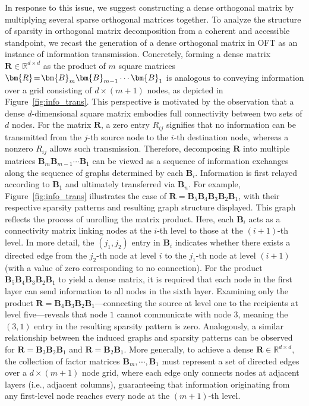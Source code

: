 In response to this issue, we suggest constructing a dense orthogonal matrix by multiplying several sparse orthogonal matrices together. To analyze the structure of sparsity in orthogonal matrix decomposition from a coherent and accessible standpoint, we recast the generation of a dense orthogonal matrix in OFT as an instance of information transmission. Concretely, forming a dense matrix $\bm{R}\in\mathbb{R}^{d\times d}$ as the product of $m$ square matrices $\thickmuskip=2mu \medmuskip=2mu \bm{R}=\bm{B}_m\bm{B}_{m-1}\cdots\bm{B}_1$ is analogous to conveying information over a grid consisting of $d\times (m+1)$ nodes, as depicted in Figure~\ref{fig:info_trans}. This perspective is motivated by the observation that a dense $d$-dimensional square matrix embodies full connectivity between two sets of $d$ nodes. For the matrix $\bm{R}$, a zero entry $R_{ij}$ signifies that no information can be transmitted from the $j$-th source node to the $i$-th destination node, whereas a nonzero $R_{ij}$ allows such transmission. Therefore, decomposing $\bm{R}$ into multiple matrices $\bm{B}_m\bm{B}_{m-1}\cdots\bm{B}_1$ can be viewed as a sequence of information exchanges along the sequence of graphs determined by each $\bm{B}_i$. Information is first relayed according to $\bm{B}_1$ and ultimately transferred via $\bm{B}_n$. For example, Figure~\ref{fig:info_trans} illustrates the case of $\bm{R}=\bm{B}_5\bm{B}_4\bm{B}_3\bm{B}_2\bm{B}_1$, with their respective sparsity patterns and resulting graph structure displayed. This graph reflects the process of unrolling the matrix product. Here, each $\bm{B}_i$ acts as a connectivity matrix linking nodes at the $i$-th level to those at the $(i+1)$-th level. In more detail, the $(j_1,j_2)$ entry in $\bm{B}_i$ indicates whether there exists a directed edge from the $j_2$-th node at level $i$ to the $j_1$-th node at level $(i+1)$ (with a value of zero corresponding to no connection). For the product $\bm{B}_5\bm{B}_4\bm{B}_3\bm{B}_2\bm{B}_1$ to yield a dense matrix, it is required that each node in the first layer can send information to all nodes in the sixth layer. Examining only the product $\bm{R}=\bm{B}_4\bm{B}_3\bm{B}_2\bm{B}_1$—connecting the source at level one to the recipients at level five—reveals that node $1$ cannot communicate with node $3$, meaning the $(3,1)$ entry in the resulting sparsity pattern is zero. Analogously, a similar relationship between the induced graphs and sparsity patterns can be observed for $\bm{R}=\bm{B}_3\bm{B}_2\bm{B}_1$ and $\bm{R}=\bm{B}_2\bm{B}_1$. More generally, to achieve a dense $\bm{R}\in\mathbb{R}^{d\times d}$, the collection of factor matrices $\bm{B}_m,\cdots,\bm{B}_1$ must represent a set of directed edges over a $d\times (m+1)$ node grid, where each edge only connects nodes at adjacent layers (i.e., adjacent columns), guaranteeing that information originating from any first-level node reaches every node at the $(m+1)$-th level.

